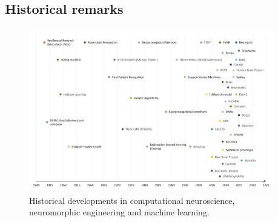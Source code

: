 \subsection{Historical remarks}
\begin{figure}[t!]
	\centering
	\includegraphics[width=0.95\textwidth,height=270px, natwidth=944,natheight=350]{imgs/Neuromorphic_Timeline_alpha.png}
	\caption{Historical developments in computational neuroscience, neuromorphic engineering and machine learning.}
	\label{fig:neuro_time}
\end{figure}

